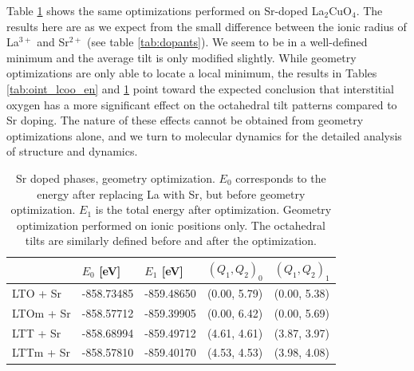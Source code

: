 Table \ref{tab:oint_lsco_en} shows the same optimizations performed on Sr-doped La$_2$CuO$_4$. The results here are as we expect from the small difference between the ionic radius of La$^{3+}$ and Sr$^{2+}$ (see table \ref{tab:dopants}). We seem to be in a well-defined minimum and the average tilt is only modified slightly. While geometry optimizations are only able to locate a local minimum, the results in Tables \ref{tab:oint_lcoo_en} and \ref{tab:oint_lsco_en} point toward the expected conclusion that interstitial oxygen has a more significant effect on the octahedral tilt patterns compared to Sr doping. The nature of these effects cannot be obtained from geometry optimizations alone, and we turn to molecular dynamics for the detailed analysis of structure and dynamics.

\begin{table}[b]
	\centering
	\caption[Sr doped phases: Energy]{Sr doped phases, geometry optimization. $E_0$ corresponds to the energy after replacing La with Sr, but before geometry optimization. $E_1$ is the total energy after optimization. Geometry optimization performed on ionic positions only. The octahedral tilts are similarly defined before and after the optimization.}
	\label{tab:oint_lsco_en}
	\begin{tabular}{lllll}
    \toprule
	 & $E_0$ [eV] & $E_1$ [eV] & $(Q_1, Q_2)_0$ & $(Q_1, Q_2)_1$  \\ 
	\midrule
    LTO + Sr                  & -858.73485             & -859.48650  & (0.00, 5.79) & (0.00, 5.38) \\
	LTOm + Sr                    & -858.57712             & -859.39905  & (0.00, 6.42) & (0.00, 5.69) \\
	LTT + Sr                    & -858.68994            & -859.49712  & (4.61, 4.61) & (3.87, 3.97) \\
	LTTm + Sr                    & -858.57810           & -859.40170  & (4.53, 4.53) & (3.98, 4.08) \\
	\bottomrule
    \end{tabular}
\end{table}

